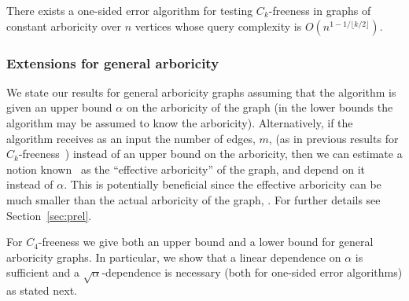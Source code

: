 \begin{theorem}\label{thm:Ck-ub-intro}
There exists a one-sided error algorithm for testing $C_k$-freeness in graphs of constant arboricity over $n$ vertices whose query complexity %
is $O(n^{1-1/\lfloor k/2 \rfloor })$. 
\end{theorem}


\begin{theorem}\label{thm:Gen-F-ub-intro}
\end{theorem}


 \subsubsection{Extensions for general arboricity}


We state our results for general arboricity graphs assuming that the algorithm is given an 
upper bound $\alpha$ on the arboricity of the graph (in  the lower bounds the algorithm may be assumed to know the arboricity).
Alternatively,
if the algorithm receives as an input the number of edges, $m$, (as in previous results for $C_k$-freeness~\cite{AKKR08, Reut}) instead of an upper bound on the arboricity, then we can estimate a notion known~\cite{Reut} as the ``effective arboricity'' of the graph, and depend on it instead of $\alpha$. This is potentially beneficial since the effective arboricity can be much smaller than the actual arboricity of the graph, . For further details see Section~\ref{sec:prel}.

For $C_4$-freeness we give both an upper bound and a lower bound for general arboricity graphs. In particular, we show that a linear dependence on $\alpha$ is sufficient and a $\sqrt{\alpha}$-dependence is necessary (both for one-sided error algorithms) as stated next.


